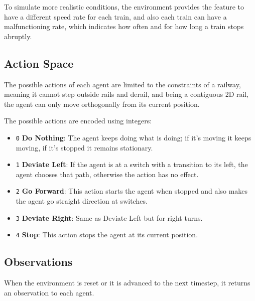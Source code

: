 \documentclass[13pt]{article}
\begin{document}
To simulate more realistic conditions, the environment provides the feature to have a different speed rate for each train, and also each train can have a malfunctioning rate, which indicates how often and for how long a train stops abruptly.

\subsection{Action Space}
The possible actions of each agent are limited to the constraints of a railway, meaning it cannot step outside rails and derail, and being a contiguous 2D rail, the agent can only move orthogonally from its current position.

The possible actions are encoded using integers:
\begin{itemize}
    \item \texttt{0} \textbf{Do Nothing}: The agent keeps doing what is doing; if it's moving it keeps moving, if it's stopped it remains stationary.
    \item \texttt{1} \textbf{Deviate Left}: If the agent is at a switch with a transition to its left, the agent chooses that path, otherwise the action has no effect.
    \item \texttt{2} \textbf{Go Forward}: This action starts the agent when stopped and also makes the agent go straight direction at switches.
    \item \texttt{3} \textbf{Deviate Right}: Same as Deviate Left but for right turns.
    \item \texttt{4} \textbf{Stop}: This action stops the agent at its current position.
\end{itemize}

\subsection{Observations}
When the environment is reset or it is advanced to the next timestep, it returns an observation to each agent.
\end{document}
